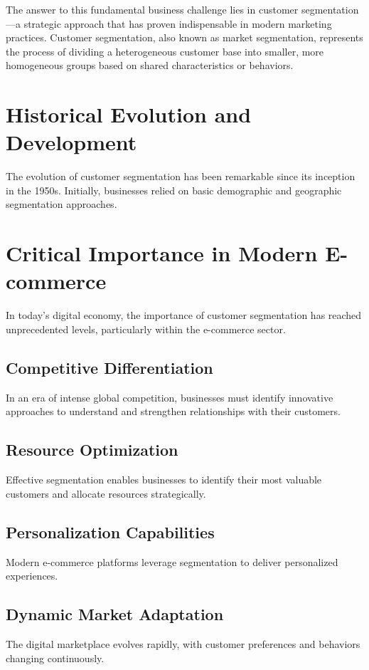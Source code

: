 \documentclass[12pt, a4paper, oneside]{report}
\begin{document}
The answer to this fundamental business challenge lies in customer segmentation---a strategic approach that has proven indispensable in modern marketing practices. Customer segmentation, also known as market segmentation, represents the process of dividing a heterogeneous customer base into smaller, more homogeneous groups based on shared characteristics or behaviors.


\section{Historical Evolution and Development}

The evolution of customer segmentation has been remarkable since its inception in the 1950s. Initially, businesses relied on basic demographic and geographic segmentation approaches.


\section{Critical Importance in Modern E-commerce}

In today's digital economy, the importance of customer segmentation has reached unprecedented levels, particularly within the e-commerce sector.

\subsection{Competitive Differentiation}
In an era of intense global competition, businesses must identify innovative approaches to understand and strengthen relationships with their customers.

\subsection{Resource Optimization}
Effective segmentation enables businesses to identify their most valuable customers and allocate resources strategically.

\subsection{Personalization Capabilities}
Modern e-commerce platforms leverage segmentation to deliver personalized experiences.

\subsection{Dynamic Market Adaptation}
The digital marketplace evolves rapidly, with customer preferences and behaviors changing continuously.
\end{document}
